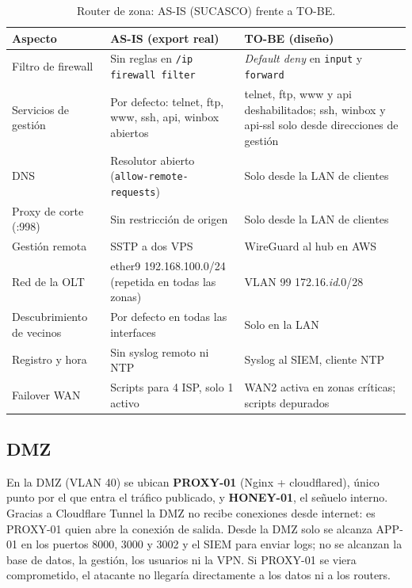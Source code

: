 \begin{table}[htbp]
\centering
\caption{Router de zona: AS-IS (SUCASCO) frente a TO-BE.}
\label{tab:ce03-asis-tobe}
\small
\begin{tabularx}{\textwidth}{L{3cm}L{4.6cm}X}
\toprule
\textbf{Aspecto} & \textbf{AS-IS (export real)} & \textbf{TO-BE (diseño)} \\
\midrule
Filtro de firewall & Sin reglas en \texttt{/ip firewall filter} & \emph{Default deny} en \texttt{input} y \texttt{forward} \\
Servicios de gestión & Por defecto: telnet, ftp, www, ssh, api, winbox abiertos & telnet, ftp, www y api deshabilitados; ssh, winbox y api-ssl solo desde direcciones de gestión \\
DNS & Resolutor abierto (\texttt{allow-remote-requests}) & Solo desde la LAN de clientes \\
Proxy de corte (:998) & Sin restricción de origen & Solo desde la LAN de clientes \\
Gestión remota & SSTP a dos VPS & WireGuard al hub en AWS \\
Red de la OLT & ether9 192.168.100.0/24 (repetida en todas las zonas) & VLAN 99 172.16.\textit{id}.0/28 \\
Descubrimiento de vecinos & Por defecto en todas las interfaces & Solo en la LAN \\
Registro y hora & Sin syslog remoto ni NTP & Syslog al SIEM, cliente NTP \\
Failover WAN & Scripts para 4 ISP, solo 1 activo & WAN2 activa en zonas críticas; scripts depurados \\
\bottomrule
\end{tabularx}
\end{table}



\subsection{DMZ}

En la DMZ (VLAN 40) se ubican \textbf{PROXY-01} (Nginx + cloudflared), único punto por el
que entra el tráfico publicado, y \textbf{HONEY-01}, el señuelo interno. Gracias a
Cloudflare Tunnel la DMZ no recibe conexiones desde internet: es PROXY-01 quien abre la
conexión de salida. Desde la DMZ solo se alcanza APP-01 en los puertos 8000, 3000 y 3002
y el SIEM para enviar logs; no se alcanzan la base de datos, la gestión, los usuarios
ni la VPN. Si PROXY-01 se viera comprometido, el atacante no llegaría directamente a
los datos ni a los routers.

